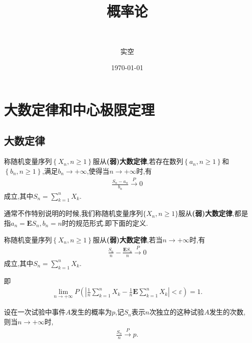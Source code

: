 \documentclass[lang=cn,newtx,10pt,sCheme=Chinese,citestyle=gb7714-2015, bibstyle=gb7714-2015]{../../Template/elegantbook}
\title{概率论}
\subtitle{\,\,}
\author{实空}
\institute{无}
\date{\today}
\begin{document}
\maketitle
\frontmatter

\tableofcontents

\mainmatter%

\chapter{大数定律和中心极限定理}

\section{大数定律}

\begin{definition}[(弱)大数定律]\label{definition:(弱)大数定律}
称随机变量序列$\left\{ X_n,n\geqslant 1 \right\} $服从\textbf{(弱)大数定律},若存在数列$\left\{a_n,n\geqslant  1\right\}$和$\left\{b_n,n\geqslant  1\right\}$,满足$b_n \to +\infty$,使得当$n\to +\infty$时,有
\begin{align*}
\frac{S_n-a_n}{b_n}\overset{P}{\rightarrow}0
\end{align*}
成立,其中$S_n=\sum\limits_{k=1}^n{X_k}$.
\end{definition}
\begin{note}
通常不作特别说明的时候,我们称随机变量序列$\{X_n,n\geqslant  1\}$服从\textbf{(弱)大数定律},都是指$a_n=\boldsymbol{E}S_n,b_n=n$时的规范形式.即下面的定义.
\end{note}

\begin{definition}[(弱)大数定律的规范形式]\label{definition:(弱)大数定律的规范形式}
称随机变量序列$\left\{ X_n,n\geqslant 1 \right\}$服从\textbf{(弱)大数定律},若当$n\to +\infty$时,有
\begin{align*}
\frac{S_n}{n}-\frac{\boldsymbol{E}S_n}{n}\overset{P}{\rightarrow}0
\end{align*}
成立,其中$S_n=\sum\limits_{k=1}^n{X_k}$.

即
\begin{align*}
\underset{n\rightarrow +\infty}{\lim}P\left( \left| \frac{1}{n}\sum_{k=1}^n{X_k}-\frac{1}{n}\boldsymbol{E}\sum_{k=1}^n{X_k} \right|<\varepsilon \right) =1.
\end{align*}
\end{definition}

\begin{theorem}[Bernoulli大数定律]\label{theorem:Bernoulli大数定律}
设在一次试验中事件$A$发生的概率为$p$,记$S_n$表示$n$次独立的这种试验$A$发生的次数,则当$n\to +\infty$时,
\begin{align*}
\frac{S_n}{n}\overset{P}{\rightarrow}p.
\end{align*}
\end{theorem}
\end{document}
